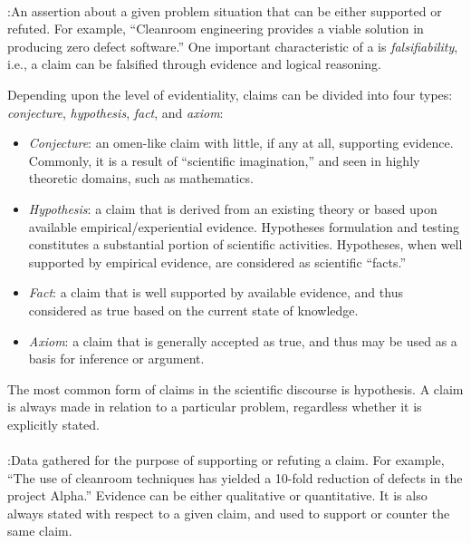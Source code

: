 \paragraph{}

\noindent{}:\hspace{.2in}An assertion about a given problem
situation that can be either supported or refuted. For example, ``Cleanroom
engineering provides a viable solution in producing zero defect software.''
One important characteristic of a  is {\it
falsifiability\/}, i.e., a claim can be falsified through evidence and
logical reasoning.

Depending upon the level of evidentiality, claims can be divided into four
types: {\it conjecture\/}, {\it hypothesis\/}, {\it fact\/}, and {\it
axiom\/}:

\begin{itemize}
\item {\it Conjecture\/}: an omen-like claim with little, if any at all,
  supporting evidence. Commonly, it is a result of ``scientific
  imagination,'' and seen in highly theoretic domains, such as mathematics.
  
\item {\it Hypothesis\/}: a claim that is derived from an existing theory
  or based upon available empirical/experiential evidence. Hypotheses
  formulation and testing constitutes a substantial portion of scientific
  activities. Hypotheses, when well supported by empirical evidence, are 
  considered as scientific ``facts.''
  
\item {\it Fact\/}: a claim that is well supported by available evidence,
  and thus considered as true based on the current state of knowledge.
  
\item {\it Axiom\/}: a claim that is generally accepted as true, and thus
  may be used as a basis for inference or argument.
\end{itemize}

The most common form of claims in the scientific discourse is
{\sf hypothesis\/}. A claim is always made in relation to a particular
problem, regardless whether it is explicitly stated.

\paragraph{}

\noindent{}:\hspace{.2in}Data gathered for the purpose
of supporting or refuting a claim. For example, ``The use of cleanroom
techniques has yielded a 10-fold reduction of defects in the project
Alpha.''  Evidence can be either qualitative or quantitative. It is also
always stated with respect to a given claim, and used to support or counter
the same claim.

